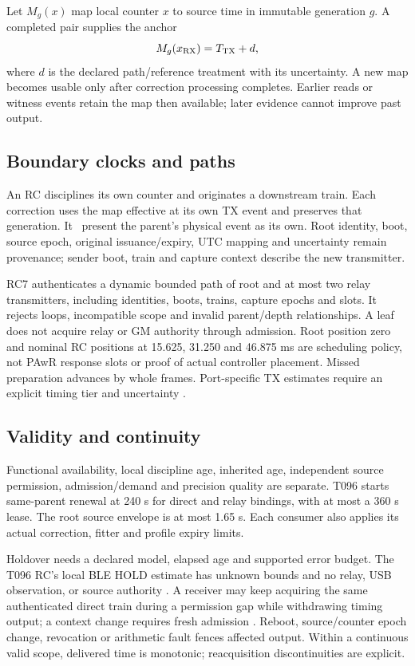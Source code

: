 \documentclass[11pt,letterpaper]{article}
\begin{document}
Let $M_g(x)$ map local counter $x$ to source time in immutable generation $g$. A completed pair supplies the anchor
\[
M_g(x_{\rm RX})=T_{\rm TX}+d,
\]
where $d$ is the declared path/reference treatment with its uncertainty. A new map becomes usable only after correction processing completes. Earlier reads or witness events retain the map then available; later evidence cannot improve past output.

\subsection*{Boundary clocks and paths}
An RC disciplines its own counter and originates a downstream train. Each correction uses the map effective at its own TX event and preserves that generation. It \mustnot\ present the parent's physical event as its own. Root identity, boot, source epoch, original issuance/expiry, UTC mapping and uncertainty remain provenance; sender boot, train and capture context describe the new transmitter.

RC7 authenticates a dynamic bounded path of root and at most two relay transmitters, including identities, boots, trains, capture epochs and slots. It rejects loops, incompatible scope and invalid parent/depth relationships. A leaf does not acquire relay or GM authority through admission. Root position zero and nominal RC positions at 15.625, 31.250 and 46.875 ms are scheduling policy, not PAwR response slots or proof of actual controller placement. Missed preparation advances by whole frames. Port-specific TX estimates require an explicit timing tier and uncertainty \cite{wire}.

\subsection*{Validity and continuity}
Functional availability, local discipline age, inherited age, independent source permission, admission/demand and precision quality are separate. T096 starts same-parent renewal at 240 s for direct and relay bindings, with at most a 360 s lease. The root source envelope is at most 1.65 s. Each consumer also applies its actual correction, fitter and profile expiry limits.

Holdover needs a declared model, elapsed age and supported error budget. The T096 RC's local BLE HOLD estimate has unknown bounds and no relay, USB observation, or source authority \cite{hold}. A receiver may keep acquiring the same authenticated direct train during a permission gap while withdrawing timing output; a context change requires fresh admission \cite{recovery}. Reboot, source/counter epoch change, revocation or arithmetic fault fences affected output. Within a continuous valid scope, delivered time is monotonic; reacquisition discontinuities are explicit.
\end{document}
